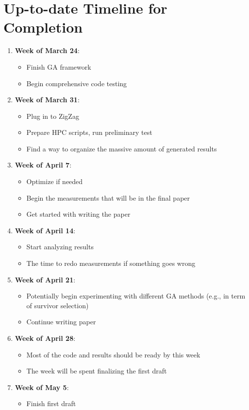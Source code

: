 \documentclass[sigconf]{acmart}
\begin{document}
\section{Up-to-date Timeline for Completion}

\begin{enumerate}
  \item \textbf{Week of March 24}:
  \begin{itemize}
    \item Finish GA framework
    \item Begin comprehensive code testing
  \end{itemize}
  \item \textbf{Week of March 31}:
  \begin{itemize}
    \item Plug in to ZigZag
    \item Prepare HPC scripts, run preliminary test
    \item Find a way to organize the massive amount of generated results
  \end{itemize}
  \item \textbf{Week of April 7}:
  \begin{itemize}
    \item Optimize if needed
    \item Begin the measurements that will be in the final paper
    \item Get started with writing the paper
  \end{itemize}
  \item \textbf{Week of April 14}:
  \begin{itemize}
    \item Start analyzing results
    \item The time to redo measurements if something goes wrong
  \end{itemize}
  \item \textbf{Week of April 21}:
  \begin{itemize}
    \item Potentially begin experimenting with different GA methods (e.g., in term of survivor selection)
    \item Continue writing paper
  \end{itemize}
  \item \textbf{Week of April 28}:
  \begin{itemize}
    \item Most of the code and results should be ready by this week
    \item The week will be spent finalizing the first draft
  \end{itemize}
  \item \textbf{Week of May 5}:
  \begin{itemize}
    \item Finish first draft
  \end{itemize}
\end{enumerate}




%
%
\end{document}

